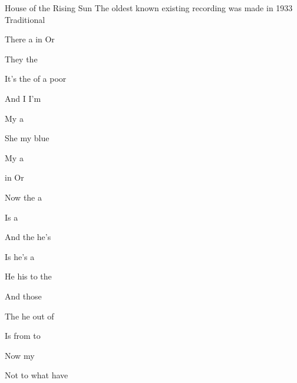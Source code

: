 \begin{SBSong}{House of the Rising Sun}  
  {The oldest known existing recording was made in 1933}
  {Traditional}
  \begin{SBVerse}
    There  a  in  Or
    
    They  the   
    
    It's  the  of  a poor 
    
    And  I  I'm  
  \end{SBVerse}
  \begin{SBVerse}
    My   a  
    
    She  my  blue  
    
    My   a  
    
     in  Or 
  \end{SBVerse}
  
  \begin{SBVerse}
    Now the   a  
    
    Is a    
    
    And the   he's 
    
    Is  he's  a  
  \end{SBVerse}
  \begin{SBVerse}
    He  his   to the 
    
    And  those   
    
    The   he  out of 
    
    Is  from  to  
  \end{SBVerse}
  \begin{SBVerse}
    Now  my   
    
    Not to  what  have  
    

\end{SBVerse}
\end{SBSong}
